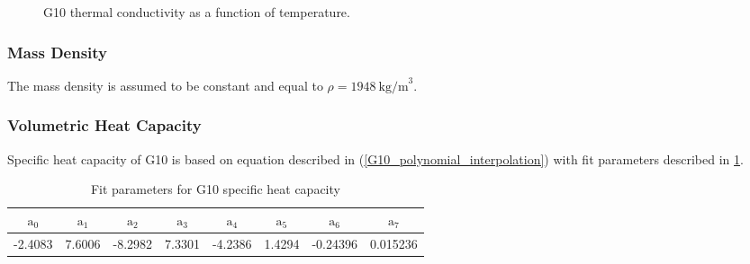 \begin{figure}[h!]
    \centering
    \caption{G10 thermal conductivity as a function of temperature.}
    \label{fig:g10_k_plot}
\end{figure}
 
 \subsubsection{Mass Density}
 The mass density is assumed to be constant and equal to $\rho = 1948~\text{kg/m}^{3}$.

\newpage
\subsubsection{Volumetric Heat Capacity}
Specific heat capacity of G10 is based on equation described in (\ref{G10_polynomial_interpolation}) with fit parameters described in \ref{table:nist_g10_cp_parameters}. 

\begin{table}[h!]
    \caption{Fit parameters for G10 specific heat capacity} 
    \vspace{-1.em} 
    \fontsize{10}{10}
    \selectfont 
    \renewcommand{\arraystretch}{1.5}
    \begin{center}
    \begin{tabular}{ cccccccc }  
    $\text{a}_0$ & $\text{a}_1$ & $\text{a}_2$ & $\text{a}_3$ & $\text{a}_4$ & $\text{a}_5$ & $\text{a}_6$ & $\text{a}_7$ \\
    \hline
    -2.4083 & 7.6006 & -8.2982 & 7.3301 & -4.2386 & 1.4294 & -0.24396 & 0.015236 \\
    \hline 
    \end{tabular}
    \end{center}  
     \label{table:nist_g10_cp_parameters} 
 \end{table}

